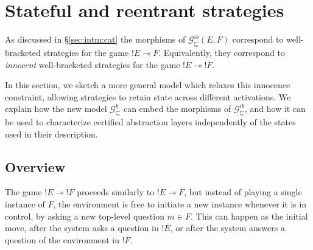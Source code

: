 \documentclass[sigplan,screen]{acmart}
\newcommand{\gcat}{\mathcal{G}_{\sqsubseteq}}
\begin{document}

\section{Stateful and reentrant strategies} \label{sec:gamesem} %


As discussed in \S\ref{sec:intm:cat}
the morphisms of $\gcat^{ib}(E, F)$
correspond to well-bracketed strategies
for the game ${!E} \multimap F$.
Equivalently, they correspond to
\emph{innocent} well-bracketed strategies
for the game ${!E} \multimap {!F}$.

In this section,
we sketch a more general model
which relaxes this innocence constraint,
allowing strategies to retain state
across different activations.
We explain how the new model $\gcat^b$ can embed
the morphisms of $\gcat^{ib}$,
and how it can be used to characterize
certified abstraction layers
independently of the states used in their description.


\subsection{Overview} %
\label{sec:arrow}

The game ${!E} \multimap {!F}$
proceeds similarly to ${!E} \multimap F$,
but instead of playing a single instance of $F$,
the environment is free to initiate a new instance
whenever it is in control,
by asking a new top-level question $m \in F$.
This can happen as the initial move,
after the system asks a question in ${!E}$,
or after the system answers
a question of the environment in ${!F}$.


\end{document}
